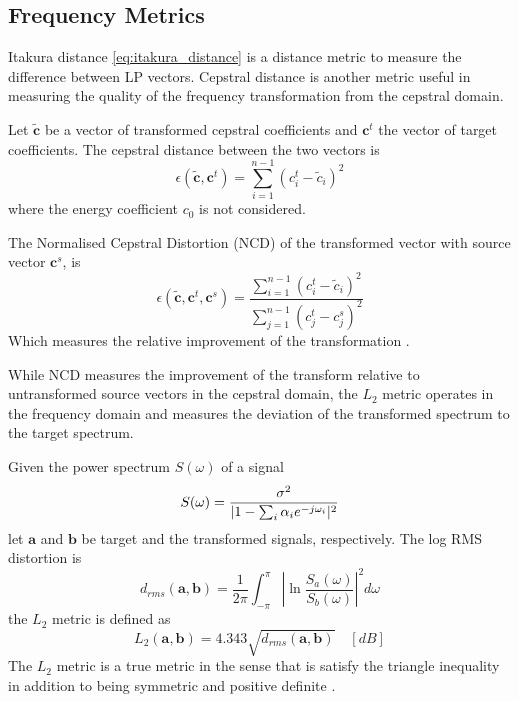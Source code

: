 \subsection{Frequency Metrics} %
\label{sub:frequency_metrics}
Itakura distance \eqref{eq:itakura_distance} is a distance metric to measure the difference between LP vectors. Cepstral distance is another metric useful in measuring the quality of the frequency transformation from the cepstral domain. 
\begin{definition}
	Let $\tilde{\mathbf{c}}$ be a vector of transformed cepstral coefficients and $\mathbf{c}^t$ the vector of target coefficients. The cepstral distance between the two vectors is
	\begin{equation}
		\label{eq:cepstral_distance}
		\epsilon(\tilde{\mathbf{c}},\mathbf{c}^t) = \sum_{i=1}^{n-1}(c_{i}^t-\tilde{c}_{i})^2
	\end{equation}
	where the energy coefficient $c_0$ is not considered.
	
	The Normalised Cepstral Distortion (NCD) of the transformed vector with source vector $\mathbf{c}^s$, is
	\begin{equation}
		\label{eq:ncd}
		\epsilon(\tilde{\mathbf{c}},\mathbf{c}^t,\mathbf{c}^s) = \frac{{\sum}_{i=1}^{n-1}(c_{i}^t-\tilde{c}_{i})^2}{\sum_{j=1}^{n-1}(c_{j}^t-c_{j}^s)^2}
	\end{equation}
	Which measures the relative improvement of the transformation \cite{najjary04}.
\end{definition}

While NCD measures the improvement of the transform relative to untransformed source vectors in the cepstral domain, the $L_2$ metric operates in the frequency domain and measures the deviation of the transformed spectrum to the target spectrum.

\begin{definition}
	Given the power spectrum $S(\omega)$ of a signal
\begin{equation}
	S(\omega) = \frac{\sigma^2}{\lvert1-\sum_{i}\alpha_i e^{-j\omega_i}\rvert^2}
\end{equation}
let $\mathbf{a}$ and $\mathbf{b}$ be target and the transformed signals, respectively. The log RMS distortion is
\begin{equation}
	d_{rms}(\mathbf{a},\mathbf{b}) = \frac{1}{2\pi}\int_{-\pi}^{\pi}\left\lvert\ln \frac{S_a(\omega)}{S_b(\omega)}\right\rvert^2 d\omega
\end{equation}
the $L_2$ metric is defined as \cite{gray76}
\begin{equation}
	\label{eq:l2_metric}
	L_2(\mathbf{a},\mathbf{b})  = 4.343 \sqrt{d_{rms}(\mathbf{a},\mathbf{b})} \quad [dB]
\end{equation}
The $L_2$ metric is a true metric in the sense that is satisfy the triangle inequality in addition to being symmetric and positive definite \cite{kreyszig89}.
\end{definition}

